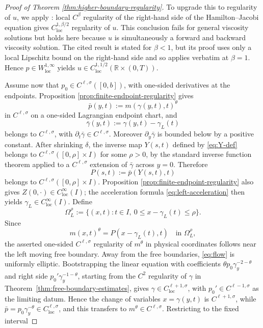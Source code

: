 \documentclass[11pt]{amsart}
\newcommand{\R}{\mathbb R}
\newcommand{\loc}{\mathrm{loc}}
\begin{document}
\begin{proof}[Proof of Theorem \ref{thm:higher-boundary-regularity}]
To upgrade this to regularity of \(u\), we apply \cite[Thm.~4.23]{CMP}:
local \(C^\beta\) regularity of the right-hand side of the
Hamilton--Jacobi equation gives \(C^{1,\beta/2}_{\loc}\) regularity of
\(u\). This conclusion fails for general viscosity solutions but holds
here because \(u\) is simultaneously a forward and backward viscosity
solution. The cited result is stated for \(\beta<1\), but its proof uses
only a local Lipschitz bound on the right-hand side and so applies
verbatim at \(\beta=1\). Hence \(p\in W^{1,\infty}_{\loc}\) yields
\(u\in C^{1,1/2}_{\loc}(\R\times(0,T))\).

Assume now that \(p_0\in C^{\ell,\sigma}([0,b])\), with one-sided derivatives at the endpoints.
Proposition \ref{prop:finite-endpoint-regularity} gives
\[
        \bar{p}(y,t):=m(\gamma(y,t),t)^\theta
\]
in \(C^{\ell,\sigma}\) on a one-sided Lagrangian endpoint chart, and
\[
        \bar{\gamma}(y,t):=\gamma(y,t)-\gamma_L(t)
\]
belongs to \(C^{\ell,\sigma}\), with
\(\partial_t\bar{\gamma}\in C^{\ell,\sigma}\). Moreover
\(\partial_y \bar{\gamma}\) is bounded below by a positive constant.
After shrinking \(\delta\), the inverse map \(Y(s,t)\) defined by
\eqref{eq:Y-def} belongs to \(C^{\ell,\sigma}([0,\rho]\times I)\)
for some \(\rho>0\), by the standard inverse function theorem
applied to a \(C^{\ell,\sigma}\) extension of \(\bar{\gamma}\) across \(y=0\). Therefore
\[
        P(s,t):=\bar{p}(Y(s,t),t)
\]
belongs to \(C^{\ell,\sigma}([0,\rho]\times I)\). Proposition
\ref{prop:finite-endpoint-regularity} also gives
\(Z(0,\cdot)\in C^\infty_{\loc}(I)\); the acceleration formula
\eqref{eq:left-acceleration} then yields \(\gamma_L\in C^\infty_{\loc}(I)\).
Define
\[
        \Omega_L^\rho:=\{(x,t):t\in I,\ 0\le x-\gamma_L(t)\le\rho\}.
\]
Since
\[
        m(x,t)^\theta=P(x-\gamma_L(t),t)
        \quad\text{in }\Omega_L^\rho,
\]
the asserted one-sided \(C^{\ell,\sigma}\) regularity of \(m^\theta\) in physical
coordinates follows near the left moving free boundary. Away from the free
boundaries, \eqref{eq:flow} is uniformly elliptic. Bootstrapping the linear
equation with coefficients
\(\theta p_0\gamma_y^{-2-\theta}\) and right side
\(p_0'\gamma_y^{-1-\theta}\), starting from the \(C^2\) regularity of
\(\gamma\) in Theorem~\ref{thm:free-boundary-estimates}, gives
\(\gamma\in C^{\ell+1,\sigma}_{\loc}\), with \(p_0'\in
C^{\ell-1,\sigma}\) as the limiting datum. Hence the change of variables
\(x=\gamma(y,t)\) is \(C^{\ell+1,\sigma}\), while
\(\bar p=p_0\gamma_y^{-\theta}\in C^{\ell,\sigma}_{\loc}\), and this transfers
to \(m^\theta\in C^{\ell,\sigma}\). Restricting to the fixed interval

\end{proof}
\end{document}
